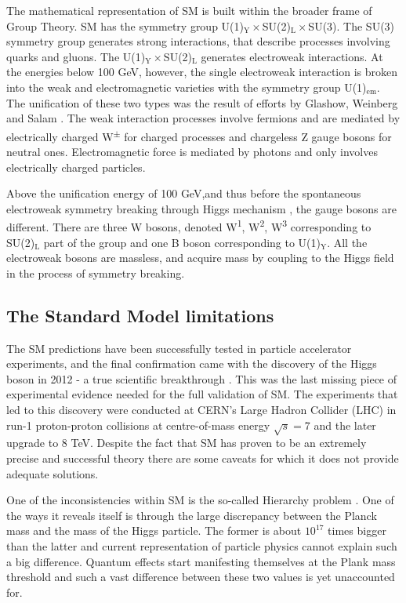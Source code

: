The mathematical representation of SM is built within the broader frame of Group Theory.  SM has the symmetry group U(1)$_{\text{Y}}\times$SU(2)$_{\text{L}}\times$SU(3). The SU(3) symmetry group generates strong interactions, that describe processes involving quarks and gluons. The U(1)$_{\text{Y}}\times$SU(2)$_{\text{L}}$ generates electroweak interactions. At the energies below 100 GeV, however, the single electroweak interaction is broken into the weak and electromagnetic varieties with the symmetry group U(1)$_{\text{em}}$. 
The unification of these two types was the result of efforts by Glashow, Weinberg and Salam \citep{Glashow:1961tr,weinberg1967model,salam1968elementary}. 
The weak interaction processes involve fermions and are mediated by electrically charged W\textsuperscript{$\pm$} for charged processes and chargeless Z gauge bosons for neutral ones. Electromagnetic force is mediated by photons and only involves electrically charged particles. 

Above the unification energy of 100 GeV,and thus before the spontaneous electroweak symmetry breaking  through Higgs mechanism \citep{englert1964broken, higgs1964broken}, the gauge bosons are different. There are three W bosons, denoted W\textsuperscript{1}, W\textsuperscript{2}, W\textsuperscript{3} corresponding to SU(2)$_{\text{L}}$ part of the group and one B boson corresponding to U(1)$_{\text{Y}}$. 
All the electroweak bosons are massless, and acquire mass by coupling to the Higgs field in the process of symmetry breaking.  

\subsection{The Standard Model limitations}

The SM predictions have been successfully tested in particle accelerator experiments, and the final confirmation came with the discovery of the Higgs boson in 2012 - a true scientific breakthrough \citep{Aad:2012tfa}\citep{chatrchyan2012observation}. This was the last missing piece of experimental evidence needed for the full validation of SM. The experiments that led to this discovery were conducted at CERN’s Large Hadron Collider (LHC) in run-1 proton-proton collisions at centre-of-mass energy $\sqrt{s}=$7 and the later upgrade to 8 TeV.  
Despite the fact that SM has proven to be an extremely precise and successful theory there are some caveats for which it does not provide  adequate solutions. 

One of the inconsistencies within SM is the so-called Hierarchy problem \citep{PhysRevD.14.1667}. One of the ways it reveals itself is through the large discrepancy between the Planck mass and the mass of the Higgs particle. The former is about $10^{17}$ times bigger than the latter and current representation of particle physics cannot explain such a big difference. Quantum effects start manifesting themselves at the Plank mass threshold and such a vast difference between these two values is yet unaccounted for. 

